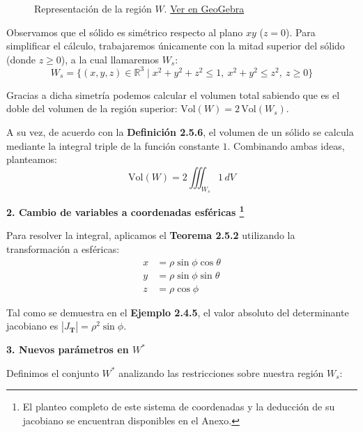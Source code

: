 \begin{figure}[htbp]
    \caption{Representación de la región $W$. \href{https://www.geogebra.org/calculator/rkksx3su}{Ver en GeoGebra}}
\end{figure}
Observamos que el sólido es simétrico respecto al plano $xy$ ($z=0$). Para simplificar el cálculo, trabajaremos únicamente con la mitad superior del sólido (donde $z \geq 0$), a la cual llamaremos $W_s$:
\[
    W_s = \{ (x,y,z) \in \mathbb{R}^3 \mid x^2 + y^2 + z^2 \leq 1, \ x^2 + y^2 \leq z^2, \ z \geq 0 \}
\]

Gracias a dicha simetría podemos calcular el volumen total sabiendo que es el doble del volumen de la región superior: $\text{Vol}(W) = 2 \, \text{Vol}(W_s)$. 

A su vez, de acuerdo con la \textbf{Definición 2.5.6}, el volumen de un sólido se calcula mediante la integral triple de la función constante $1$. Combinando ambas ideas, planteamos:
\[
    \text{Vol}(W) = 2 \iiint_{W_s} 1 \, dV
\]

\textbf{2. Cambio de variables a coordenadas esféricas \footnote{El planteo completo de este sistema de coordenadas y la deducción de su jacobiano se encuentran disponibles en el Anexo.}}  

Para resolver la integral, aplicamos el \textbf{Teorema 2.5.2} utilizando la transformación a esféricas:
\begin{align*}
    x &= \rho \sin \phi \cos \theta \\
    y &= \rho \sin \phi \sin \theta \\
    z &= \rho \cos \phi
\end{align*}

Tal como se demuestra en el \textbf{Ejemplo 2.4.5}, el valor absoluto del determinante jacobiano es $|J_{\mathbf{T}}| = \rho^2 \sin \phi$.

\vspace{0.3cm}
\textbf{3. Nuevos parámetros en $W^*$}

Definimos el conjunto $W^*$ analizando las restricciones sobre nuestra región $W_s$:


